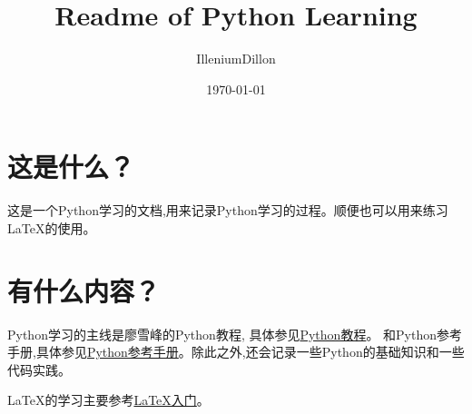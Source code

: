 \documentclass[a4paper,12pt]{article}
\begin{document}
    \title{Readme of Python Learning}
    \author{IlleniumDillon}
    \date{\today}
    \maketitle  

    \section{这是什么？}
        这是一个Python学习的文档,用来记录Python学习的过程。顺便也可以用来练习LaTeX的使用。
    \section{有什么内容？}
        Python学习的主线是廖雪峰的Python教程, 具体参见\href{https://www.liaoxuefeng.com/wiki/1016959663602400}{Python教程}。
        和Python参考手册,具体参见\href{https://docs.python.org/zh-cn/3/reference/index.html#reference-index}{Python参考手册}。除此之外,还会记录一些Python的基础知识和一些代码实践。\par
        LaTeX的学习主要参考\href{https://oi-wiki.org/tools/latex/}{LaTeX入门}。
\end{document}
